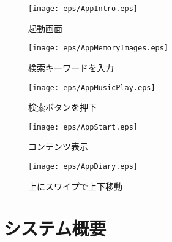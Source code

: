\begin{figure}[htbp]
 \begin{minipage}{0.45\hsize}
  \begin{center}
   \texttt{[image: eps/AppIntro.eps]}
  \end{center}
  \caption{起動画面}
  \label{le01}
 \end{minipage}
 \begin{minipage}{0.45\hsize}
  \begin{center}
   \texttt{[image: eps/AppMemoryImages.eps]}
  \end{center}
  \caption{検索キーワードを入力}
  \label{le02}
 \end{minipage}
\end{figure}

\begin{figure}[htbp]
 \begin{minipage}{0.45\hsize}
  \begin{center}
   \texttt{[image: eps/AppMusicPlay.eps]}
  \end{center}
  \caption{検索ボタンを押下}
  \label{le03}
 \end{minipage}
 \begin{minipage}{0.45\hsize}
  \begin{center}
   \texttt{[image: eps/AppStart.eps]}
  \end{center}
  \caption{コンテンツ表示}
  \label{le04}
 \end{minipage}
\end{figure}

\begin{figure}[htbp]
 \begin{minipage}{0.45\hsize}
  \begin{center}
   \texttt{[image: eps/AppDiary.eps]}
  \end{center}
  \caption{上にスワイプで上下移動}
  \label{le05}
 \end{minipage}
 \begin{minipage}{0.45\hsize}
 \end{minipage}
\end{figure}

\section{システム概要}
